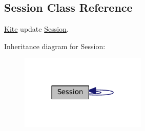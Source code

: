 \hypertarget{classKite_1_1Session}{}\subsection{Session Class Reference}
\label{classKite_1_1Session}


\mbox{\hyperlink{namespaceKite}{Kite}} update \mbox{\hyperlink{classKite_1_1Session}{Session}}.  




Inheritance diagram for Session\+:\nopagebreak
\begin{figure}[H]
\begin{center}
\leavevmode
\includegraphics[width=170pt]{classKite_1_1Session__inherit__graph}
\end{center}
\end{figure}
